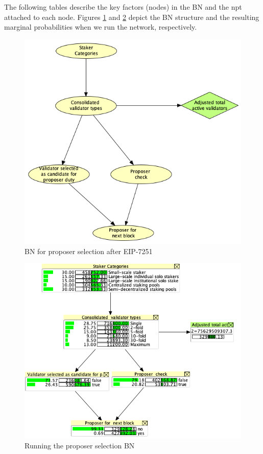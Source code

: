 The following tables describe the key factors (nodes) in the BN and the \gls{npt} attached to each node. Figures \ref{fig:proposerbn} and \ref{fig:proposerbnrun} depict the BN structure and the resulting marginal probabilities when we run the network, respectively.
 
\begin{figure}[htbp]
\begin{center}
\includegraphics[width=0.6\linewidth]{images/proposer-bn}
\caption{BN for proposer selection after EIP-7251}
\label{fig:proposerbn}
\end{center}
\end{figure}

\begin{figure}[htbp]
\begin{center}
\includegraphics[width=0.7\linewidth]{images/proposer-bn-run}
\caption{Running the proposer selection BN}
\label{fig:proposerbnrun}
\end{center}
\end{figure}

\clearpage


